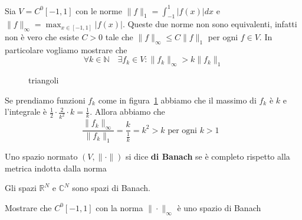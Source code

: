 \begin{example}
    Sia \(V = C^{0}[-1, 1]\) con le norme \(\|f\|_{1} = \int_{-1}^{1} |f(x)|dx\)
    e \(\|f\|_{\infty} = \max_{x \in [-1, 1]} |f(x)|\). Queste due norme non sono
    equivalenti, infatti non è vero che esiste \(C > 0\) tale
    che \(\|f\|_\infty \le C \|f\|_1\) per ogni \(f \in V\).
    In particolare vogliamo mostrare che
    \[
        \forall k \in \mathbb{N} \quad \exists f_k \in V : \|f_k\|_\infty > k
        \|f_k\|_1
    \]
\begin{figure}[ht]
    \centering
    \caption{triangoli}
    \label{fig:triangoli}
\end{figure}
    Se prendiamo funzioni \(f_k\) come in figura~\ref{fig:triangoli} abbiamo che
    il massimo di \(f_k\) è \(k\) e l'integrale è \(\frac{1}{2} \cdot
    \frac{2}{k^2} \cdot k = \frac{1}{k}\). Allora abbiamo che 
    \[
        \frac{\|f_k\|_\infty}{\|f_k\|_1} = \frac{k}{\frac{1}{k}} = k^2 > k
        \text{ per ogni  \(k > 1\) }
    \]
\end{example}

\begin{definition}
    Uno spazio normato \({(V, \|\cdot \|)}\) si dice \textbf{di Banach} se è
    completo rispetto alla metrica indotta dalla norma
\end{definition}
\begin{example}
    Gli spazi \(\mathbb{R}^{N}\) e \(\mathbb{C}^{N}\) sono spazi di Banach.
\end{example}

\begin{eser}
    Mostrare che \(C^{0}{[-1, 1]}\) con la norma \(\|\cdot \|_\infty\) è
    uno spazio di Banach
\end{eser}

